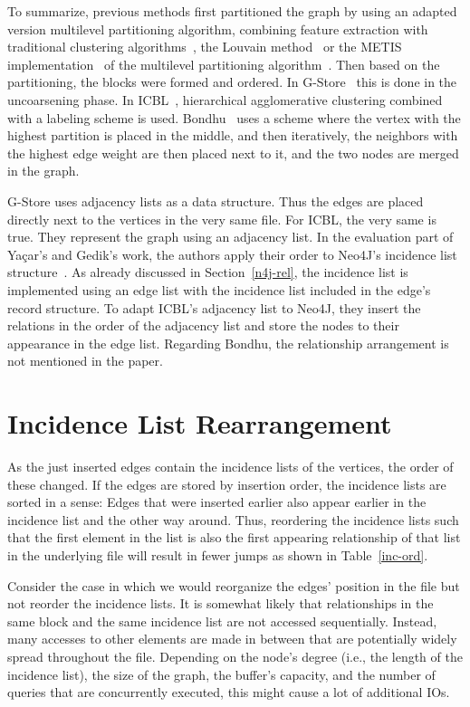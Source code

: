      To summarize, previous methods first partitioned the graph by using an adapted version multilevel partitioning algorithm, combining feature extraction with traditional clustering algorithms~\autocite{overview_clust}, the Louvain method~\autocite{blondel2008fast} or the METIS implementation~\autocite{karypis} of the multilevel partitioning algorithm~\autocite{hendrickson1995multi}.
    Then based on the partitioning, the blocks were formed and ordered.
    In G-Store~\autocite{steinhaus2010g} this is done in the uncoarsening phase.
    In ICBL~\autocite{yacsar2017distributed, yacsar2015scalable}, hierarchical agglomerative clustering combined with a labeling scheme is used.
    Bondhu~\autocite{hoque2012disk} uses a scheme where the vertex with the highest partition is placed in the middle, and then iteratively, the neighbors with the highest edge weight are then placed next to it, and the two nodes are merged in the graph. 
    
    G-Store uses adjacency lists as a data structure.
    Thus the edges are placed directly next to the vertices in the very same file.
    For ICBL, the very same is true.
    They represent the graph using an adjacency list. 
    In the evaluation part of Ya\c{c}ar's and Gedik's work, the authors apply their order to Neo4J's incidence list structure~\autocite{Rodriguez2010ConstructionsFD, robinson2015graph}. 
    As already discussed in Section~\ref{n4j-rel}, the incidence list is implemented using an edge list with the incidence list included in the edge's record structure.
    To adapt ICBL's adjacency list to Neo4J, they insert the relations in the order of the adjacency list and store the nodes to their appearance in the edge list.    
    Regarding Bondhu\autocite{hoque2012disk}, the relationship arrangement is not mentioned in the paper.
    
    
\section{Incidence List Rearrangement}\label{\positionnumber}
    As the just inserted edges contain the incidence lists of the vertices, the order of these changed.
    If the edges are stored by insertion order, the incidence lists are sorted in a sense: 
    Edges that were inserted earlier also appear earlier in the incidence list and the other way around.
    Thus, reordering the incidence lists such that the first element in the list is also the first appearing relationship of that list in the underlying file will result in fewer jumps as shown in Table~\ref{inc-ord}.
    
    Consider the case in which we would reorganize the edges' position in the file but not reorder the incidence lists. 
    It is somewhat likely that relationships in the same block and the same incidence list are not accessed sequentially.
    Instead, many accesses to other elements are made in between that are potentially widely spread throughout the file.
    Depending on the node's degree (i.e., the length of the incidence list), the size of the graph, the buffer's capacity, and the number of queries that are concurrently executed, this might cause a lot of additional IOs.

